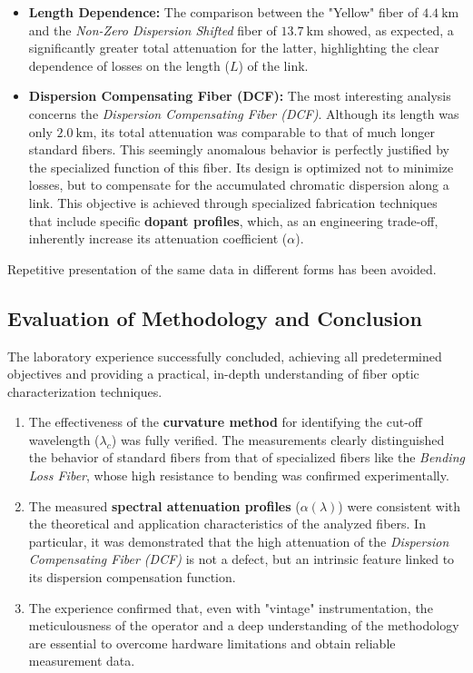 \documentclass[a4paper,11pt]{article}
\theoremstyle{mythmstyle}
\begin{document}
\begin{itemize}
    \item \textbf{Length Dependence:} The comparison between the "Yellow" fiber of $4.4\ \text{km}$ and the \textit{Non-Zero Dispersion Shifted} fiber of $13.7\ \text{km}$ showed, as expected, a significantly greater total attenuation for the latter, highlighting the clear dependence of losses on the length ($L$) of the link.
    
    \item \textbf{Dispersion Compensating Fiber (DCF):} The most interesting analysis concerns the \textit{Dispersion Compensating Fiber (DCF)}. Although its length was only $2.0\ \text{km}$, its total attenuation was comparable to that of much longer standard fibers. This seemingly anomalous behavior is perfectly justified by the specialized function of this fiber. Its design is optimized not to minimize losses, but to compensate for the accumulated chromatic dispersion along a link. This objective is achieved through specialized fabrication techniques that include specific \textbf{dopant profiles}, which, as an engineering trade-off, inherently increase its attenuation coefficient ($\alpha$).
\end{itemize}
Repetitive presentation of the same data in different forms has been avoided.

\subsection{Evaluation of Methodology and Conclusion}
The laboratory experience successfully concluded, achieving all predetermined objectives and providing a practical, in-depth understanding of fiber optic characterization techniques.

\begin{enumerate}
    \item The effectiveness of the \textbf{curvature method} for identifying the cut-off wavelength ($\lambda_c$) was fully verified. The measurements clearly distinguished the behavior of standard fibers from that of specialized fibers like the \textit{Bending Loss Fiber}, whose high resistance to bending was confirmed experimentally.
    \item The measured \textbf{spectral attenuation profiles} ($\alpha(\lambda)$) were consistent with the theoretical and application characteristics of the analyzed fibers. In particular, it was demonstrated that the high attenuation of the \textit{Dispersion Compensating Fiber (DCF)} is not a defect, but an intrinsic feature linked to its dispersion compensation function.
    \item The experience confirmed that, even with "vintage" instrumentation, the meticulousness of the operator and a deep understanding of the methodology are essential to overcome hardware limitations and obtain reliable measurement data.
\end{enumerate}
\end{document}
